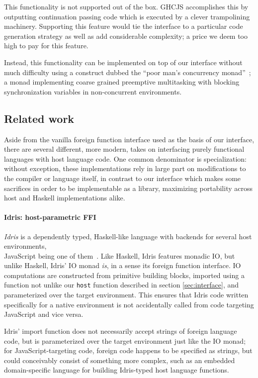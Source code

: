 \documentclass[preprint]{sigplanconf}
\begin{document}
This functionality is not supported out of the box. GHCJS accomplishes this
by outputting continuation passing code which is executed by a clever
trampolining machinery. Supporting this feature would tie the interface to
a particular code generation strategy as well as add considerable complexity;
a price we deem too high to pay for this feature.

Instead, this functionality can be implemented on top of our interface without
much difficulty using a construct dubbed the ``poor man's concurrency
monad''\ \cite{poormansconcurrencymonad}; a monad implementing coarse grained
preemptive multitasking with blocking synchronization variables in
non-concurrent environments.

\subsection{Related work}\label{sec:related}
Aside from the vanilla foreign function interface used as the basis of our
interface, there are several different, more modern, takes on interfacing
purely functional languages with host language code.
One common denominator is specialization: without exception, these
implementations rely in large part on modifications to the compiler or
language itself, in contrast to our interface which makes some sacrifices
in order to be implementable as a library, maximizing portability across
host and Haskell implementations alike.

\paragraph{Idris: host-parametric FFI}
\emph{Idris} is a dependently typed, Haskell-like language with backends for
several host environments,\\
JavaScript being one of them\ \cite{idris}.
Like Haskell, Idris features monadic IO, but unlike Haskell, Idris' IO monad
\emph{is}, in a sense its foreign function interface.
IO computations are constructed from primitive building blocks, imported using
a function not unlike our \lstinline!host! function described in section
\ref{sec:interface}, and parameterized over the target environment.
This ensures that Idris code written specifically for a native environment
is not accidentally called from code targeting JavaScript and vice versa.

Idris' import function does not necessarily accept strings of foreign
language code, but is parameterized over the target environment just like the
IO monad; for JavaScript-targeting code, foreign code happens to be specified
as strings, but could conceivably consist of something more complex, such as
an embedded domain-specific language for building Idris-typed host language
functions.
\end{document}
